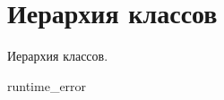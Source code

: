 \section{Иерархия классов}
Иерархия классов.\begin{DoxyCompactList}
\item {}
\item runtime\+\_\+error\begin{DoxyCompactList}
\item {}
\end{DoxyCompactList}
\end{DoxyCompactList}
